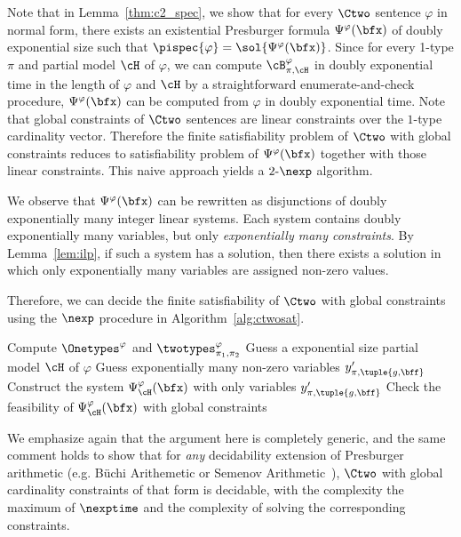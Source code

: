 Note that in Lemma~\ref{thm:c2_spec},
we show that for every $\Ctwo$ sentence $\varphi$ in normal form,
there exists an existential Presburger formula $\Psi^\varphi(\bfx)$ of doubly exponential size 
such that $\pispec{\varphi} = \sol{\Psi^\varphi(\bfx)}$.
Since for every 1-type $\pi$ and partial model $\cH$ of $\varphi$, we can compute $\cB^{\varphi}_{\pi, \cH}$ in doubly exponential time in the length of $\varphi$ and $\cH$ by a straightforward enumerate-and-check procedure,
$\Psi^\varphi(\bfx)$ can be computed from $\varphi$ in doubly exponential time.
Note that global constraints of $\Ctwo$ sentences are linear constraints over the $1$-type cardinality vector.
Therefore the finite satisfiability problem of $\Ctwo$ with global constraints reduces
to satisfiability problem of $\Psi^\varphi(\bfx)$ together with those linear constraints.
This naive approach yields a $2\text{-}\nexp$ algorithm.

We observe that $\Psi^\varphi(\bfx)$ can be rewritten as disjunctions of doubly exponentially many integer linear systems.
Each system contains doubly exponentially many variables, but only \emph{exponentially many constraints}.
By Lemma~\ref{lem:ilp}, if such a system has a solution,
then there exists a solution in which only exponentially many variables are assigned non-zero values.

Therefore, we can decide the finite satisfiability of $\Ctwo$ with global constraints 
using the $\nexp$ procedure in Algorithm~\ref{alg:ctwosat}.

\begin{algorithm}
\begin{algorithmic}[1]
\caption{Algorithm for the finite satisfiability problem of $\Ctwo$ with global constraints}\label{alg:ctwosat}
    \State Compute $\Onetypes^\varphi$ and $\twotypes^\varphi_{\pi_1, \pi_2}$
    \State Guess a exponential size partial model $\cH$ of $\varphi$
    \State Guess exponentially many non-zero variables $y'_{\pi, \tuple{g, \bff}}$
    \State Construct the system $\Psi^\varphi_{\cH}(\bfx)$ with only variables $y'_{\pi, \tuple{g, \bff}}$
    \State Check the feasibility of $\Psi^\varphi_{\cH}(\bfx)$ with global constraints
\EndProcedure
\end{algorithmic}
\end{algorithm}

We emphasize again that the argument here is completely generic, and the same comment holds to show that for \emph{any} decidability extension of Presburger arithmetic (e.g. B\"uchi Arithemetic or Semenov Arithmetic~\cite{semenovpresexp}), $\Ctwo$ with global cardinality constraints of that form is decidable, with the complexity the maximum of $\nexptime$ and the complexity of solving the corresponding constraints.

